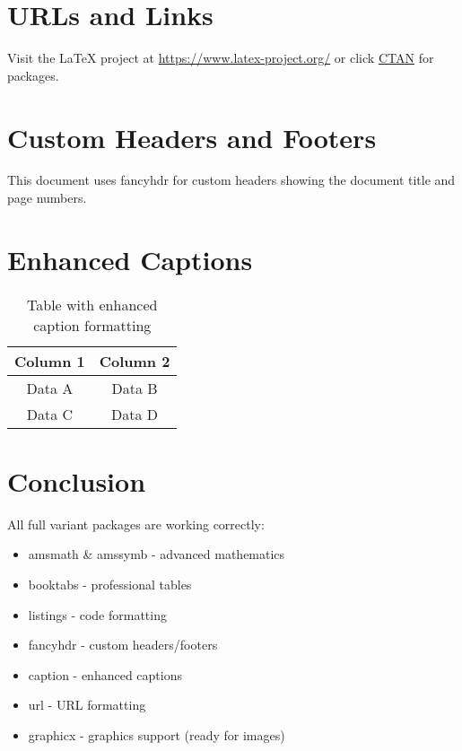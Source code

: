 \documentclass{article}
\begin{document}
\section{URLs and Links}
Visit the LaTeX project at \url{https://www.latex-project.org/} or click \href{https://ctan.org/}{CTAN} for packages.

\section{Custom Headers and Footers}
This document uses fancyhdr for custom headers showing the document title and page numbers.

\section{Enhanced Captions}
\captionsetup{font=small, labelfont=bf}

\begin{table}[h]
\centering
\caption{Table with enhanced caption formatting}
\begin{tabular}{cc}
\toprule
Column 1 & Column 2 \\
\midrule
Data A & Data B \\
Data C & Data D \\
\bottomrule
\end{tabular}
\end{table}

\section{Conclusion}
All full variant packages are working correctly:
\begin{itemize}[label=\textcolor{green}{$\checkmark$}]
    \item amsmath \& amssymb - advanced mathematics
    \item booktabs - professional tables
    \item listings - code formatting
    \item fancyhdr - custom headers/footers
    \item caption - enhanced captions
    \item url - URL formatting
    \item graphicx - graphics support (ready for images)
\end{itemize}
\end{document}
